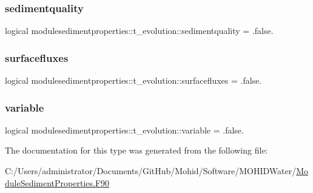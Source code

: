 \subsubsection{\texorpdfstring{sedimentquality}{sedimentquality}}
{\footnotesize\ttfamily logical modulesedimentproperties\+::t\+\_\+evolution\+::sedimentquality = .false.\hspace{0.3cm}{\ttfamily [private]}}

\mbox{\label{structmodulesedimentproperties_1_1t__evolution_aec1adaa86545cb6683153ee372de6886}} 
\subsubsection{\texorpdfstring{surfacefluxes}{surfacefluxes}}
{\footnotesize\ttfamily logical modulesedimentproperties\+::t\+\_\+evolution\+::surfacefluxes = .false.\hspace{0.3cm}{\ttfamily [private]}}

\mbox{\label{structmodulesedimentproperties_1_1t__evolution_ad5c3d3ae000d4eb63fa8c41d59d59722}} 
\subsubsection{\texorpdfstring{variable}{variable}}
{\footnotesize\ttfamily logical modulesedimentproperties\+::t\+\_\+evolution\+::variable = .false.\hspace{0.3cm}{\ttfamily [private]}}



The documentation for this type was generated from the following file\+:\begin{DoxyCompactItemize}
\item 
C\+:/\+Users/administrator/\+Documents/\+Git\+Hub/\+Mohid/\+Software/\+M\+O\+H\+I\+D\+Water/\mbox{\hyperlink{_module_sediment_properties_8_f90}{Module\+Sediment\+Properties.\+F90}}\end{DoxyCompactItemize}
